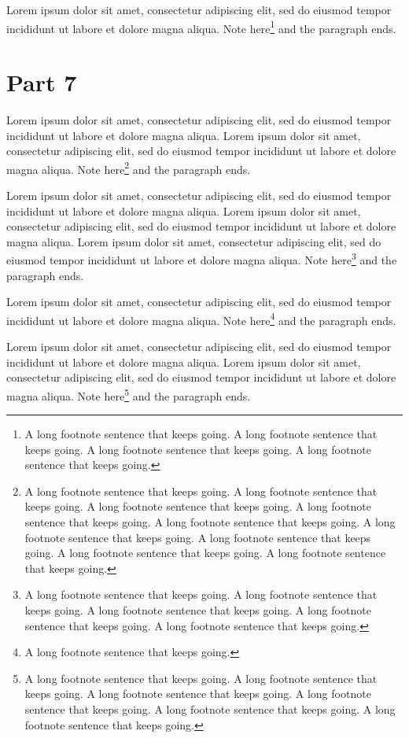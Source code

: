 \documentclass{article}
\begin{document}
Lorem ipsum dolor sit amet, consectetur adipiscing elit, sed do eiusmod tempor incididunt ut labore et dolore magna aliqua. Note here\footnote{A long footnote sentence that keeps going. A long footnote sentence that keeps going. A long footnote sentence that keeps going. A long footnote sentence that keeps going. } and the paragraph ends.

\section{Part 7}
Lorem ipsum dolor sit amet, consectetur adipiscing elit, sed do eiusmod tempor incididunt ut labore et dolore magna aliqua. Lorem ipsum dolor sit amet, consectetur adipiscing elit, sed do eiusmod tempor incididunt ut labore et dolore magna aliqua. Note here\footnote{A long footnote sentence that keeps going. A long footnote sentence that keeps going. A long footnote sentence that keeps going. A long footnote sentence that keeps going. A long footnote sentence that keeps going. A long footnote sentence that keeps going. A long footnote sentence that keeps going. A long footnote sentence that keeps going. A long footnote sentence that keeps going. } and the paragraph ends.

Lorem ipsum dolor sit amet, consectetur adipiscing elit, sed do eiusmod tempor incididunt ut labore et dolore magna aliqua. Lorem ipsum dolor sit amet, consectetur adipiscing elit, sed do eiusmod tempor incididunt ut labore et dolore magna aliqua. Lorem ipsum dolor sit amet, consectetur adipiscing elit, sed do eiusmod tempor incididunt ut labore et dolore magna aliqua. Note here\footnote{A long footnote sentence that keeps going. A long footnote sentence that keeps going. A long footnote sentence that keeps going. A long footnote sentence that keeps going. A long footnote sentence that keeps going. } and the paragraph ends.

Lorem ipsum dolor sit amet, consectetur adipiscing elit, sed do eiusmod tempor incididunt ut labore et dolore magna aliqua. Note here\footnote{A long footnote sentence that keeps going. } and the paragraph ends.

Lorem ipsum dolor sit amet, consectetur adipiscing elit, sed do eiusmod tempor incididunt ut labore et dolore magna aliqua. Lorem ipsum dolor sit amet, consectetur adipiscing elit, sed do eiusmod tempor incididunt ut labore et dolore magna aliqua. Note here\footnote{A long footnote sentence that keeps going. A long footnote sentence that keeps going. A long footnote sentence that keeps going. A long footnote sentence that keeps going. A long footnote sentence that keeps going. A long footnote sentence that keeps going. } and the paragraph ends.
\end{document}
